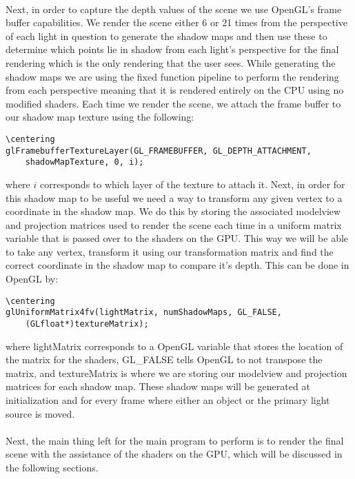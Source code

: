 \paragraph{}
Next, in order to capture the depth values of the scene we use OpenGL's frame buffer capabilities.  We render the scene either 6 or 21 times from the perspective of each light in question to generate the shadow maps and then use these to determine which points lie in shadow from each light's perspective for the final rendering which is the only rendering that the user sees.  While generating the shadow maps we are using the fixed function pipeline to perform the rendering from each perspective meaning that it is rendered entirely on the CPU using no modified shaders.  Each time we render the scene, we attach the frame buffer to our shadow map texture using the following:

\begin{lstlisting}
\centering
glFramebufferTextureLayer(GL_FRAMEBUFFER, GL_DEPTH_ATTACHMENT, 
	shadowMapTexture, 0, i);
\end{lstlisting}

where $i$ corresponds to which layer of the texture to attach it.  Next, in order for this shadow map to be useful we need a way to transform any given vertex to a coordinate in the shadow map.  We do this by storing the associated modelview and projection matrices used to render the scene each time in a uniform matrix variable that is passed over to the shaders on the GPU.  This way we will be able to take any vertex, transform it using our transformation matrix and find the correct coordinate in the shadow map to compare it's depth.  This can be done in OpenGL by:

\begin{lstlisting}
\centering
glUniformMatrix4fv(lightMatrix, numShadowMaps, GL_FALSE, 
	(GLfloat*)textureMatrix);
\end{lstlisting}

where lightMatrix corresponds to a OpenGL variable that stores the location of the matrix for the shaders, GL\_FALSE tells OpenGL to not transpose the matrix, and textureMatrix is where we are storing our modelview and projection matrices for each shadow map.  These shadow maps will be generated at initialization and for every frame where either an object or the primary light source is moved.

\paragraph{}
Next, the main thing left for the main program to perform is to render the final scene with the assistance of the shaders on the GPU, which will be discussed in the following sections.


